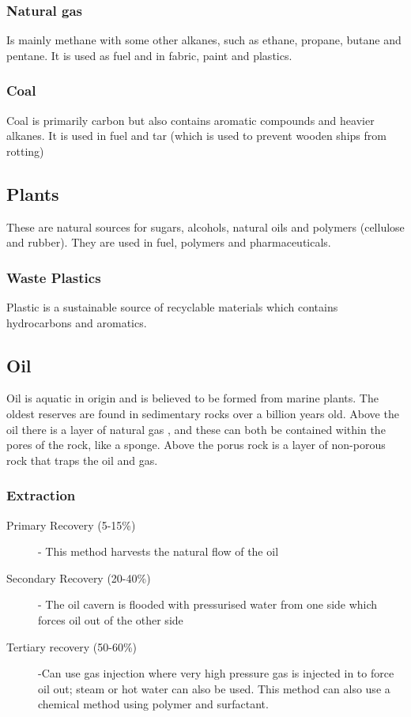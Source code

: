 \documentclass[a4paper, 12pt]{article}
\begin{document}
		\subsubsection*{Natural gas}
			Is mainly methane with some other alkanes, such as ethane, propane, butane and pentane. It is used as fuel	and in fabric, paint and plastics.
		\subsubsection*{Coal}
			Coal is primarily carbon but also contains aromatic compounds and heavier alkanes. It is used in fuel and tar (which is used to prevent wooden ships from rotting)
		\subsection*{Plants}
			These are natural sources for sugars, alcohols, natural oils and polymers (cellulose and rubber). They are used in fuel, polymers and pharmaceuticals.
		\subsubsection*{Waste Plastics}
			Plastic is a sustainable source of recyclable materials which contains hydrocarbons and aromatics.

	\subsection{Oil}
		Oil is aquatic in origin and is believed to be formed from marine plants. The oldest reserves are found in sedimentary rocks over a billion years old. Above the oil there is a layer of natural gas , and these can both be contained within the pores of the rock, like a sponge. Above the porus rock is a layer of non-porous rock that traps the oil and gas.
		\subsubsection{Extraction}
			\begin{description}
				\item[Primary Recovery (5-15\%)] - This method harvests the natural flow of the oil
				\item[Secondary Recovery (20-40\%)] - The oil cavern is flooded with pressurised water from one side which forces oil out of the other side
				\item[Tertiary recovery (50-60\%)] -Can use gas injection where very high pressure gas is injected in to force oil out; steam or hot water can also be used. This method can also use a chemical method using polymer and surfactant.
			\end{description}
			
\end{document}
